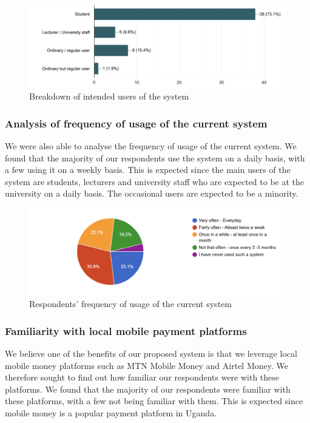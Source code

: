 \begin{figure}[h]
    \hspace{-3cm}
    \includegraphics[scale = 0.7]{images/users}
    \caption{Breakdown of intended users of the system}
\end{figure}

\clearpage

\subsubsection{Analysis of frequency of usage of the current system}
We were also able to analyse the frequency of usage of the current system. We found that the majority of our respondents use the system on a daily basis, with a few using it on a weekly basis. This is expected since the main users of the system are students, lecturers and university staff who are expected to be at the university on a daily basis. The occasional users are expected to be a minority.


\begin{figure}[h]
    \begin{center}
        \hspace{-7cm}
        \includegraphics[scale = 0.8]{images/usage}
        \caption{Respondents' frequency of usage of the current system}
    \end{center}
\end{figure}

\clearpage

\subsubsection{Familiarity with local mobile payment platforms}
We believe one of the benefits of our proposed system is that we leverage local mobile money platforms such as MTN Mobile Money and Airtel Money. We therefore sought to find out how familiar our respondents were with these platforms. We found that the majority of our respondents were familiar with these platforms, with a few not being familiar with them. This is expected since mobile money is a popular payment platform in Uganda.


